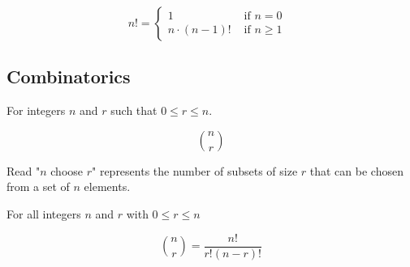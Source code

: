 \documentclass[11pt]{article}
\begin{document}
\begin{definition}\label{def:factorial-recursive}
    \begin{equation*}
        n! = 
        \begin{cases}
            1  & \text{ if $n = 0$ } \\
            n \cdot (n - 1)! & \text{ if $n \geq 1$}
        \end{cases}
    \end{equation*}
\end{definition}

\subsection{Combinatorics}

\begin{definition}\label{def:choose}
    For integers $n$ and $r$ such that $0 \leq r \leq n$.

    \begin{equation*}
        {n \choose r}
    \end{equation*}

    Read "$n$ choose $r$" represents the number of subsets of size $r$ that
    can be chosen from a set of $n$ elements.
\end{definition}

\begin{definition}\label{def:combinations}
    For all integers $n$ and $r$ with $0 \leq r \leq n$

    \begin{equation*}
        {n \choose r} = \dfrac{n!}{r!(n - r)!}
    \end{equation*}
\end{definition}
\end{document}
